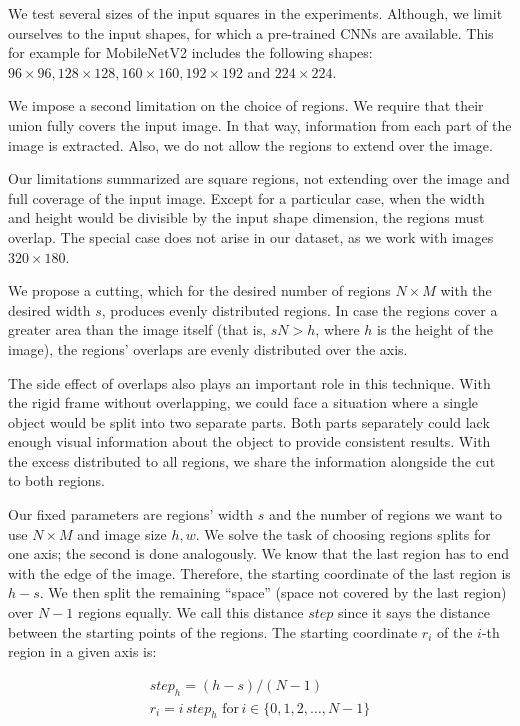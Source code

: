 We test several sizes of the input squares in the experiments. Although, we limit ourselves to the input shapes, for which a pre-trained CNNs are available. This for example for MobileNetV2 includes the following shapes: $96 \times 96, 128 \times 128, 160 \times 160, 192 \times 192$ and $224 \times 224$.

We impose a second limitation on the choice of regions. We require that their union fully covers the input image. In that way, information from each part of the image is extracted. Also, we do not allow the regions to extend over the image. 

Our limitations summarized are square regions, not extending over the image and full coverage of the input image. Except for a particular case, when the width and height would be divisible by the input shape dimension, the regions must overlap. The special case does not arise in our dataset, as we work with images $320 \times 180$.

We propose a cutting, which for the desired number of regions $N \times M$ with the desired width $s$, produces evenly distributed regions. In case the regions cover a greater area than the image itself (that is, $sN > h$, where $h$ is the height of the image), the regions' overlaps are evenly distributed over the axis.

The side effect of overlaps also plays an important role in this technique. With the rigid frame without overlapping, we could face a situation where a single object would be split into two separate parts. Both parts separately could lack enough visual information about the object to provide consistent results. With the excess distributed to all regions, we share the information alongside the cut to both regions.

Our fixed parameters are regions' width $s$ and the number of regions we want to use $N \times M$ and image size $h, w$. We solve the task of choosing regions splits for one axis; the second is done analogously. We know that the last region has to end with the edge of the image. Therefore, the starting coordinate of the last region is $h - s$. We then split the remaining ``space'' (space not covered by the last region) over $N-1$ regions equally. We call this distance $step$ since it says the distance between the starting points of the regions. The starting coordinate $r_i$ of the $i$-th region in a given axis is:

\begin{align*}
step_h = (h - s) / (N - 1) \\
r_i = {i \, step_h\,\,\text{for}\,i \in \{0, 1, 2, \dots, N - 1\}}
\end{align*}

